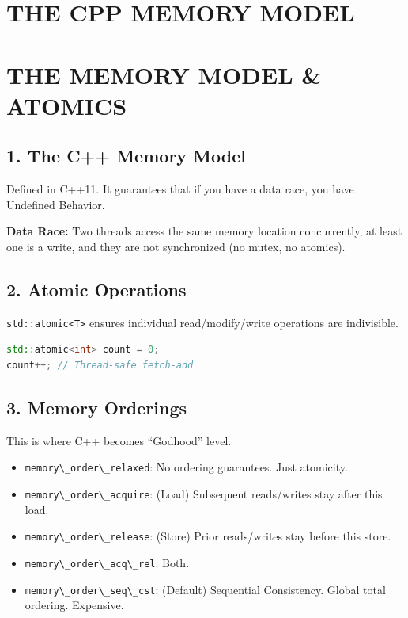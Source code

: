 \hypertarget{the-cpp-memory-model}{%
\chapter{THE CPP MEMORY MODEL}\label{the-cpp-memory-model}}

\hypertarget{the-memory-model-atomics}{%
\chapter{THE MEMORY MODEL \& ATOMICS}\label{the-memory-model-atomics}}

\hypertarget{the-c-memory-model}{%
\section{1. The C++ Memory Model}\label{the-c-memory-model}}

Defined in C++11. It guarantees that if you have a data race, you have
Undefined Behavior.

\textbf{Data Race:} Two threads access the same memory location
concurrently, at least one is a write, and they are not synchronized (no
mutex, no atomics).

\hypertarget{atomic-operations}{%
\section{2. Atomic Operations}\label{atomic-operations}}

\passthrough{\lstinline!std::atomic<T>!} ensures individual
read/modify/write operations are indivisible.

\begin{lstlisting}[language={C++}]
std::atomic<int> count = 0;
count++; // Thread-safe fetch-add
\end{lstlisting}

\hypertarget{memory-orderings}{%
\section{3. Memory Orderings}\label{memory-orderings}}

This is where C++ becomes ``Godhood'' level.

\begin{itemize}
\tightlist
\item
  \passthrough{\lstinline!memory\_order\_relaxed!}: No ordering
  guarantees. Just atomicity.
\item
  \passthrough{\lstinline!memory\_order\_acquire!}: (Load) Subsequent
  reads/writes stay after this load.
\item
  \passthrough{\lstinline!memory\_order\_release!}: (Store) Prior
  reads/writes stay before this store.
\item
  \passthrough{\lstinline!memory\_order\_acq\_rel!}: Both.
\item
  \passthrough{\lstinline!memory\_order\_seq\_cst!}: (Default)
  Sequential Consistency. Global total ordering. Expensive.
\end{itemize}

